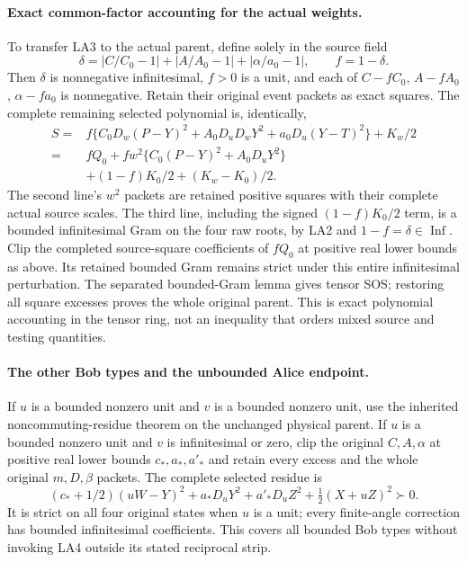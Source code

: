 \paragraph{Exact common-factor accounting for the actual weights.}
To transfer LA3 to the actual parent, define solely in the source field
\[
 \delta=|C/C_0-1|+|A/A_0-1|+|\alpha/a_0-1|,
 \qquad f=1-\delta.
\]
Then $\delta$ is nonnegative infinitesimal, $f>0$ is a unit,
and each of $C-fC_0$, $A-fA_0$, $\alpha-fa_0$ is nonnegative.
Retain their original event packets as exact squares.  The complete
remaining selected polynomial is, identically,
\[
\begin{split}
 S={}&f\{C_0D_w(P-Y)^2+A_0D_uD_wY^2
                          +a_0D_u(Y-T)^2\}+K_w/2\\
  ={}&fQ_0+fw^2\{C_0(P-Y)^2+A_0D_uY^2\}\\
    &+(1-f)K_0/2+(K_w-K_0)/2.
\end{split} \tag{LA4}
\]
The second line's $w^2$ packets are retained positive squares with
their complete actual source scales.  The third line, including the
signed $(1-f)K_0/2$ term, is a bounded infinitesimal Gram on the
four raw roots, by LA2 and $1-f=\delta\in\operatorname{Inf}$.
Clip the completed source-square coefficients of $fQ_0$ at positive
real lower bounds as above.  Its retained bounded Gram remains
strict under this entire infinitesimal perturbation.  The separated
bounded-Gram lemma gives tensor SOS; restoring all square excesses
proves the whole original parent.  This is exact polynomial
accounting in the tensor ring, not an inequality that orders mixed
source and testing quantities.

\paragraph{The other Bob types and the unbounded Alice endpoint.}
If $u$ is a bounded nonzero unit and $v$ is a bounded nonzero unit,
use the inherited noncommuting-residue theorem on the unchanged
physical parent.  If $u$ is a bounded nonzero unit and $v$ is
infinitesimal or zero, clip the original $C,A,\alpha$ at positive
real lower bounds $c_*,a_*,a'_*$ and retain every excess and the
whole original $m,D,\beta$ packets.  The complete selected residue is
\[
 (c_*+1/2)(uW-Y)^2+a_*D_uY^2
          +a'_*D_uZ^2+\tfrac12(X+uZ)^2\succ0.     \tag{LA5}
\]
It is strict on all four original states when $u$ is a unit; every
finite-angle correction has bounded infinitesimal coefficients.
This covers all bounded Bob types without invoking LA4 outside its
stated reciprocal strip.

